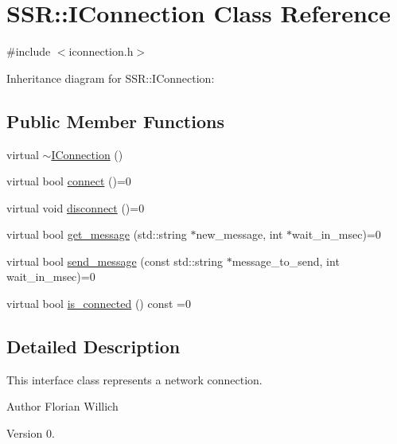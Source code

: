 \hypertarget{classSSR_1_1IConnection}{\section{S\-S\-R\-:\-:I\-Connection Class Reference}
\label{classSSR_1_1IConnection}
}


{\ttfamily \#include $<$iconnection.\-h$>$}



Inheritance diagram for S\-S\-R\-:\-:I\-Connection\-:
\subsection*{Public Member Functions}
\begin{DoxyCompactItemize}
\item 
virtual \hyperlink{classSSR_1_1IConnection_a9c9bb021de5e335863ce13046f77cac8}{$\sim$\-I\-Connection} ()
\item 
virtual bool \hyperlink{classSSR_1_1IConnection_a105a6d8e43cd9320a44034ecade1127c}{connect} ()=0
\item 
virtual void \hyperlink{classSSR_1_1IConnection_a1b457fd6b5eec8396ab0c60ae16af76a}{disconnect} ()=0
\item 
virtual bool \hyperlink{classSSR_1_1IConnection_a81bef4b41f8619cd465117b49a2404bd}{get\-\_\-message} (std\-::string $\ast$new\-\_\-message, int $\ast$wait\-\_\-in\-\_\-msec)=0
\item 
virtual bool \hyperlink{classSSR_1_1IConnection_a2cc678a37ae55b627149b00adf43e8bc}{send\-\_\-message} (const std\-::string $\ast$message\-\_\-to\-\_\-send, int wait\-\_\-in\-\_\-msec)=0
\item 
virtual bool \hyperlink{classSSR_1_1IConnection_a3b081084454585e81e095b58ada98589}{is\-\_\-connected} () const =0
\end{DoxyCompactItemize}


\subsection{Detailed Description}
This interface class represents a network connection.

\begin{DoxyAuthor}{Author}
Florian Willich 
\end{DoxyAuthor}
\begin{DoxyVersion}{Version}
0. 
\end{DoxyVersion}


